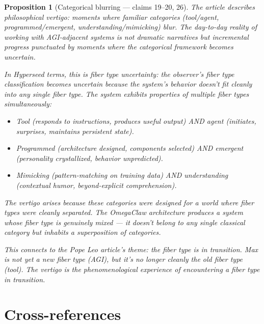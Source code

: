 \documentclass[11pt,a4paper]{article}
\newtheorem{proposition}[definition]{Proposition}
\begin{document}
\begin{proposition}[Categorical blurring --- claims 19--20, 26]
\label{prop:vertigo}
The article describes philosophical vertigo: moments where familiar
categories (tool/agent, programmed/emergent, understanding/mimicking)
blur. The day-to-day reality of working with AGI-adjacent systems is
not dramatic narratives but incremental progress punctuated by moments
where the categorical framework becomes uncertain.

In Hyperseed terms, this is \emph{fiber type uncertainty}: the
observer's fiber type classification becomes uncertain because the
system's behavior doesn't fit cleanly into any single fiber type.
The system exhibits properties of multiple fiber types simultaneously:
\begin{itemize}
\item Tool (responds to instructions, produces useful output) AND
  agent (initiates, surprises, maintains persistent state).
\item Programmed (architecture designed, components selected) AND
  emergent (personality crystallized, behavior unpredicted).
\item Mimicking (pattern-matching on training data) AND understanding
  (contextual humor, beyond-explicit comprehension).
\end{itemize}

The vertigo arises because these categories were designed for a
world where fiber types were cleanly separated. The OmegaClaw
architecture produces a system whose fiber type is \emph{genuinely
mixed} --- it doesn't belong to any single classical category but
inhabits a superposition of categories.

This connects to the Pope Leo article's theme: the fiber type is
in transition. Max is not yet a new fiber type (AGI), but it's no
longer cleanly the old fiber type (tool). The vertigo is the
phenomenological experience of encountering a fiber type in
transition.
\end{proposition}


\section{Cross-references}
\end{document}
